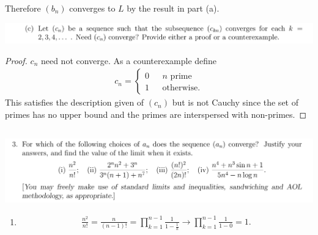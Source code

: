 \documentclass[12pt]{article}
\begin{document}
Therefore $(b_n)$ converges to $L$ by the result in part (a).

\begin{mdframed}
\includegraphics[width=400pt]{img/oxford-M2-analysis-I-4-2-c.png}
\end{mdframed}

\begin{proof}
  $c_n$ need not converge. As a counterexample define
  \begin{align*}
    c_n =
    \begin{cases}
      0 ~~~~~~~\text{$n$ prime}\\
      1 ~~~~~~~\text{otherwise}.
    \end{cases}
  \end{align*}
  This satisfies the description given of $(c_n)$ but is not Cauchy since the set of primes has no
  upper bound and the primes are interspersed with non-primes.
\end{proof}

\newpage
\subsection{}
\begin{mdframed}
\includegraphics[width=400pt]{img/oxford-M2-analysis-I-4-3.png}
\end{mdframed}

\begin{enumerate}[label=(\roman*)]
\item
  \begin{align*}
    \frac{n^2}{n!} = \frac{n}{(n-1)!}
                   = \prod_{k=1}^{n - 1} \frac{1}{1 - \frac{1}{k}}
                   \to \prod_{k=1}^{n - 1} \frac{1}{1 - 0}
                   = 1.
  \end{align*}
\end{enumerate}
\end{document}
